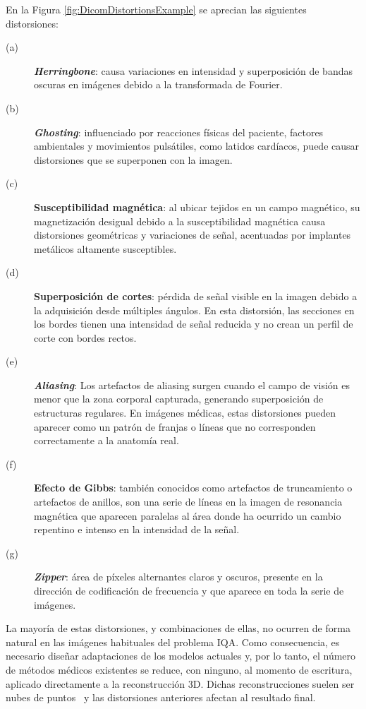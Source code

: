 En la Figura \ref{fig:DicomDistortionsExample} se aprecian las siguientes distorsiones:
\begin{description}
  \item[(a)] \textbf{\emph{Herringbone}}: causa variaciones en intensidad y superposición 
    de bandas oscuras en imágenes debido a la transformada de Fourier.
  \item[(b)] \textbf{\emph{Ghosting}}: influenciado por reacciones físicas del paciente, 
    factores ambientales y movimientos pulsátiles, como latidos cardíacos, 
    puede causar distorsiones que se superponen con la imagen.
  \item[(c)] \textbf{Susceptibilidad magnética}: al ubicar tejidos en un campo magnético, 
    su magnetización desigual debido a la susceptibilidad magnética causa 
    distorsiones geométricas y variaciones de señal, acentuadas por implantes 
    metálicos altamente susceptibles.
  \item[(d)] \textbf{Superposición de cortes}: pérdida de señal visible en la imagen 
    debido a la adquisición desde múltiples ángulos. 
    En esta distorsión, las secciones en los bordes tienen una intensidad de señal 
    reducida y no crean un perfil de corte con bordes rectos.
  \item[(e)] \textbf{\emph{Aliasing}}: Los artefactos de aliasing surgen cuando el campo 
    de visión es menor que la zona corporal capturada, generando superposición 
    de estructuras regulares. En imágenes médicas, estas distorsiones pueden 
    aparecer como un patrón de franjas o líneas que no corresponden 
    correctamente a la anatomía real.
  \item[(f)] \textbf{Efecto de Gibbs}: también conocidos como artefactos de truncamiento 
    o artefactos de anillos, son una serie de líneas en la imagen de resonancia 
    magnética que aparecen paralelas al área donde ha ocurrido un cambio repentino 
    e intenso en la intensidad de la señal.
  \item[(g)] \textbf{\emph{Zipper}}: área de píxeles alternantes claros y oscuros, presente en la dirección de codificación de frecuencia y que aparece en toda la serie de imágenes.
\end{description}
La mayoría de estas distorsiones, y combinaciones de ellas, no ocurren de forma natural 
en las imágenes habituales del problema IQA. 
Como consecuencia, es necesario diseñar adaptaciones de los modelos actuales y, por lo tanto, el número de métodos médicos 
existentes se reduce, con ninguno, al momento de escritura, aplicado directamente a la reconstrucción 3D. 
Dichas reconstrucciones suelen ser nubes de puntos~\cite{WhyUsePointCloud} y las distorsiones 
anteriores afectan al resultado final. 

